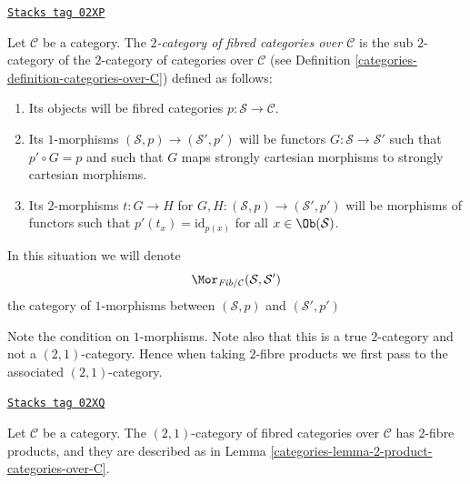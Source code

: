 \begin{definition}
\label{categories-definition-fibred-categories-over-C}
\href{https://stacks.math.columbia.edu/tag/02XP}{\texttt{Stacks tag 02XP}}

Let $\mathcal{C}$ be a category.
The {\it $2$-category of fibred categories over $\mathcal{C}$}
is the sub $2$-category of the $2$-category of categories
over $\mathcal{C}$ (see Definition \ref{categories-definition-categories-over-C})
defined as follows:
\begin{enumerate}
\item Its objects will be fibred categories
$p : \mathcal{S} \to \mathcal{C}$.
\item Its $1$-morphisms $(\mathcal{S}, p) \to (\mathcal{S}', p')$
will be functors $G : \mathcal{S} \to \mathcal{S}'$ such that
$p' \circ G = p$ and such that $G$ maps strongly cartesian
morphisms to strongly cartesian morphisms.
\item Its $2$-morphisms $t : G \to H$ for
$G, H : (\mathcal{S}, p) \to (\mathcal{S}', p')$
will be morphisms of functors
such that $p'(t_x) = \text{id}_{p(x)}$
for all $x \in \Ob(\mathcal{S})$.
\end{enumerate}
In this situation we will denote
$$
\Mor_{\textit{Fib}/\mathcal{C}}(\mathcal{S}, \mathcal{S}')
$$
the category of $1$-morphisms between
$(\mathcal{S}, p)$ and $(\mathcal{S}', p')$
\end{definition}

Note the condition on $1$-morphisms.
Note also that this is a true $2$-category and
not a $(2, 1)$-category. Hence when taking $2$-fibre
products we first pass to the associated $(2, 1)$-category.

\begin{lemma}
\label{categories-lemma-2-product-fibred-categories-over-C}
\href{https://stacks.math.columbia.edu/tag/02XQ}{\texttt{Stacks tag 02XQ}}

Let $\mathcal{C}$ be a category.
The $(2, 1)$-category of fibred categories
over $\mathcal{C}$ has 2-fibre products, and
they are described as in
Lemma \ref{categories-lemma-2-product-categories-over-C}.
\end{lemma}

